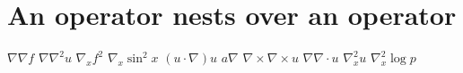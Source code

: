 \documentclass{article}
\begin{document}
\section{An operator nests over an operator}
$\nabla\nabla f$ $\nabla\nabla^{2}u$ $\nabla_{x}f^{2}$ $\nabla_{x}\sin^{2}x$ $(u\cdot\nabla)u$ $a\nabla$
$\nabla\times\nabla\times u$ $\nabla\nabla\cdot u$ $\nabla_{x}^{2}u$ $\nabla_{x}^{2}\log p$
\end{document}
